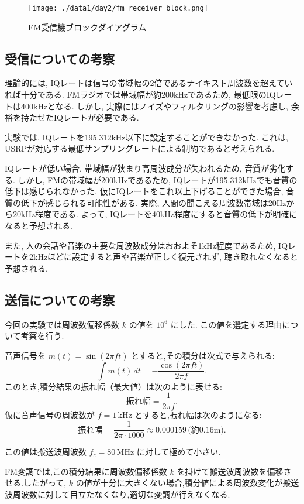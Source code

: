 \documentclass[a4paper, twocolumn]{article} %
\begin{document}
\begin{figure}[H]
    \centering
    \texttt{[image: ./data1/day2/fm\_receiver\_block.png]}
    \caption{FM受信機ブロックダイアグラム}
    \label{fig:fm_receiver_block}
\end{figure}

\subsection{受信についての考察}
理論的には, IQレートは信号の帯域幅の2倍であるナイキスト周波数を超えていれば十分である. FMラジオでは帯域幅が約200kHzであるため, 最低限のIQレートは400kHzとなる. しかし, 実際にはノイズやフィルタリングの影響を考慮し, 余裕を持たせたIQレートが必要である.

実験では, IQレートを195.312kHz以下に設定することができなかった. これは, USRPが対応する最低サンプリングレートによる制約であると考えられる.

IQレートが低い場合, 帯域幅が狭まり高周波成分が失われるため, 音質が劣化する. しかし, FMの帯域幅が200kHzであるため, IQレートが195.312kHzでも音質の低下は感じられなかった. 仮にIQレートをこれ以上下げることができた場合, 音質の低下が感じられる可能性がある. 実際, 人間の聞こえる周波数帯域は20Hzから20kHz程度である. よって, IQレートを40kHz程度にすると音質の低下が明確になると予想される.

また, 人の会話や音楽の主要な周波数成分はおおよそ1kHz程度であるため, IQレートを2kHzほどに設定すると声や音楽が正しく復元されず, 聴き取れなくなると予想される.

\subsection{送信についての考察}

今回の実験では周波数偏移係数 \(k\) の値を \(10^6\) にした.  
この値を選定する理由について考察を行う.

音声信号を \(m(t) = \sin(2\pi f t)\) とすると,その積分は次式で与えられる:
\[
\int m(t) \, dt = -\frac{\cos(2\pi f t)}{2\pi f}.
\]
このとき,積分結果の振れ幅（最大値）は次のように表せる:
\[
\text{振れ幅} = \frac{1}{2\pi f}.
\]
仮に音声信号の周波数が \(f = 1\,\mathrm{kHz}\) とすると,振れ幅は次のようになる:
\[
\text{振れ幅} = \frac{1}{2\pi \cdot 1000} \approx 0.000159\,\text{(約0.16m)}.
\]

この値は搬送波周波数 \(f_c = 80\,\mathrm{MHz}\) に対して極めて小さい.

FM変調では,この積分結果に周波数偏移係数 \(k\) を掛けて搬送波周波数を偏移させる.したがって, \(k\) の値が十分に大きくない場合,積分値による周波数変化が搬送波周波数に対して目立たなくなり,適切な変調が行えなくなる.
\end{document}
